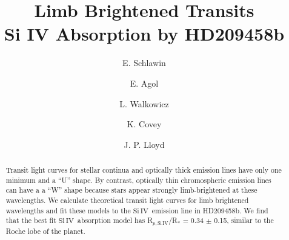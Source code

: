 \documentclass[twocolumn]{emulateapj}
\newcommand{\siIV}{\ensuremath{\mathrm{Si}\,\scriptstyle \mathrm{IV}}}
\begin{document}

\title{Limb Brightened Transits \\
Si IV Absorption by HD209458b}


\author{E. Schlawin} 
\author{E. Agol}
\author{L. Walkowicz}
\author{K. Covey}
\author{J. P. Lloyd}






\begin{abstract}
Transit light curves for stellar continua and optically thick emission lines have only one minimum and a  ``U'' shape. By contrast, optically thin chromospheric emission lines can have a  a ``W'' shape because stars appear strongly limb-brightened at these wavelengths. We calculate theoretical transit light curves for limb brightened wavelengths and fit these models to the \siIV\ emission line in HD209458b. We find that the best fit \siIV\ absorption model has R$_{p,\siIV}$/R$_*$ = 0.34 $\pm$ 0.15, similar to the Roche lobe of the planet.
\end{abstract}
\end{document}
